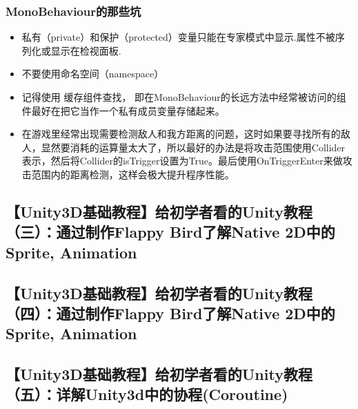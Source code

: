 \documentclass[9pt, b5paper]{article}
\begin{document}
\subsubsection{MonoBehaviour的那些坑}
\label{sec:org25ab120}
\begin{itemize}
\item 私有（private）和保护（protected）变量只能在专家模式中显示.属性不被序列化或显示在检视面板.
\item 不要使用命名空间（namespace）
\item 记得使用 缓存组件查找， 即在MonoBehaviour的长远方法中经常被访问的组件最好在把它当作一个私有成员变量存储起来。
\item 在游戏里经常出现需要检测敌人和我方距离的问题，这时如果要寻找所有的敌人，显然要消耗的运算量太大了，所以最好的办法是将攻击范围使用Collider表示，然后将Collider的isTrigger设置为True。最后使用OnTriggerEnter来做攻击范围内的距离检测，这样会极大提升程序性能。
\end{itemize}

\subsection{【Unity3D基础教程】给初学者看的Unity教程（三）：通过制作Flappy Bird了解Native 2D中的Sprite, Animation}
\label{sec:orgac12afc}
\subsection{【Unity3D基础教程】给初学者看的Unity教程（四）：通过制作Flappy Bird了解Native 2D中的Sprite, Animation}
\label{sec:org92492b5}

\subsection{【Unity3D基础教程】给初学者看的Unity教程（五）：详解Unity3d中的协程(Coroutine)}
\label{sec:orgd771425}
\end{document}
